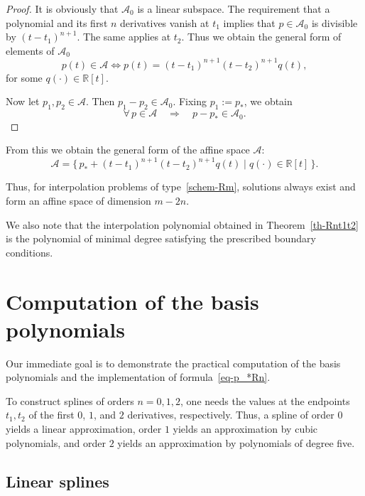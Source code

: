 \documentclass{article}
\theoremstyle{definition}
\theoremstyle{definition}
\numberwithin{figure}{section}
\newcommand{\1}{\mathbf{1}}
\begin{document}
\begin{proof}
    It is obviously that $\mathcal{A}_0$ is a linear subspace.  
    The requirement that a polynomial and its first $n$ derivatives vanish at $t_1$ implies that $p \in \mathcal{A}_0$ is divisible by $(t - t_1)^{n+1}$.  
    The same applies at $t_2$.  
    Thus we obtain the general form of elements of $\mathcal{A}_0$
    \[
        p(t)\in \mathcal{A} \Leftrightarrow p(t)=(t-t_1)^{n+1}(t-t_2)^{n+1}q(t),
    \]
for some $q(\cdot)\in\mathbb{R}[t]$.

\smallskip

    Now let $p_1, p_2 \in \mathcal{A}$. Then $p_1 - p_2 \in \mathcal{A}_0$.  
    Fixing $p_1 := p_*$, we obtain
    \[
        \forall\, p \in \mathcal{A} \quad \Rightarrow \quad p - p_* \in \mathcal{A}_0.
    \]
\end{proof}

From this we obtain the general form of the affine space $\mathcal{A}$:
\begin{equation}
    \mathcal{A}
    =
    \{\, p_* + (t - t_1)^{n+1} (t - t_2)^{n+1} q(t)
    \mid
    q(\cdot) \in \mathbb{R}[t] \,\}.
\end{equation}

Thus, for interpolation problems of type~\eqref{schem-Rm}, solutions always exist and form an affine space of dimension $m - 2n$.

We also note that the interpolation polynomial obtained in Theorem~\ref{th-Rnt1t2} is the polynomial of minimal degree satisfying the prescribed boundary conditions.

\section{Computation of the basis polynomials}\label{sec-basispol}

Our immediate goal is to demonstrate the practical computation of the basis polynomials and the implementation of formula~\eqref{eq-p_*Rn}.

To construct splines of orders $n = 0, 1, 2$, one needs the values at the endpoints $t_1, t_2$ of the first $0$, $1$, and $2$ derivatives, respectively. Thus, a spline of order $0$ yields a linear approximation, order $1$ yields an approximation by cubic polynomials, and order $2$ yields an approximation by polynomials of degree five.

\subsection{Linear splines}
\end{document}
